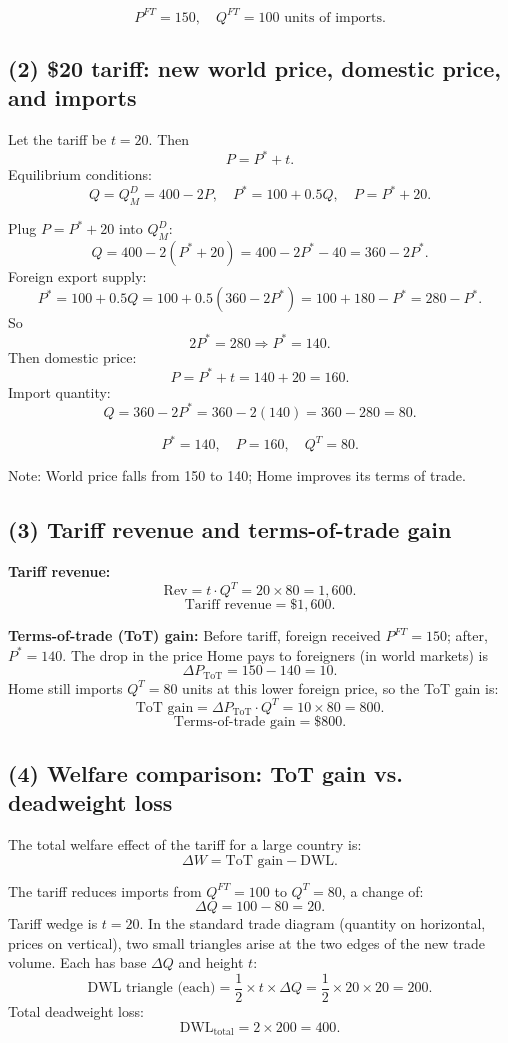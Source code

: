 \documentclass[12pt]{article}
\begin{document}
\[
\boxed{P^{FT} = 150,\quad Q^{FT} = 100 \text{ units of imports.}}
\]

\subsection*{(2) \$20 tariff: new world price, domestic price, and imports}

Let the tariff be $t = 20$. Then
\[
P = P^* + t.
\]
Equilibrium conditions:
\[
Q = Q_M^D = 400 - 2P, 
\quad
P^* = 100 + 0.5Q, 
\quad
P = P^* + 20.
\]

Plug $P = P^* + 20$ into $Q_M^D$:
\[
Q = 400 - 2(P^* + 20) = 400 - 2P^* - 40 = 360 - 2P^*.
\]
Foreign export supply:
\[
P^* = 100 + 0.5Q = 100 + 0.5(360 - 2P^*) = 100 + 180 - P^* = 280 - P^*.
\]
So
\[
2P^* = 280 \Rightarrow P^* = 140.
\]
Then domestic price:
\[
P = P^* + t = 140 + 20 = 160.
\]
Import quantity:
\[
Q = 360 - 2P^* = 360 - 2(140) = 360 - 280 = 80.
\]

\[
\boxed{P^* = 140,\quad P = 160,\quad Q^{T} = 80.}
\]

Note: World price falls from 150 to 140; Home improves its terms of trade.

\subsection*{(3) Tariff revenue and terms-of-trade gain}

\textbf{Tariff revenue:}
\[
\text{Rev} = t \cdot Q^{T} = 20 \times 80 = 1{,}600.
\]
\[
\boxed{\text{Tariff revenue} = \$1{,}600.}
\]

\textbf{Terms-of-trade (ToT) gain:}  
Before tariff, foreign received $P^{FT}=150$; after, $P^* = 140$.  
The drop in the price Home pays to foreigners (in world markets) is
\[
\Delta P_{\text{ToT}} = 150 - 140 = 10.
\]
Home still imports $Q^T = 80$ units at this lower foreign price, so the ToT gain is:
\[
\text{ToT gain} = \Delta P_{\text{ToT}} \cdot Q^{T} = 10 \times 80 = 800.
\]
\[
\boxed{\text{Terms-of-trade gain} = \$800.}
\]

\subsection*{(4) Welfare comparison: ToT gain vs. deadweight loss}

The total welfare effect of the tariff for a large country is:
\[
\Delta W = \text{ToT gain} - \text{DWL}.
\]

The tariff reduces imports from $Q^{FT}=100$ to $Q^T=80$, a change of:
\[
\Delta Q = 100 - 80 = 20.
\]
Tariff wedge is $t = 20$. In the standard trade diagram (quantity on horizontal, prices on vertical), two small triangles arise at the two edges of the new trade volume. Each has base $\Delta Q$ and height $t$:
\[
\text{DWL triangle (each)} = \frac{1}{2} \times t \times \Delta Q
= \frac{1}{2} \times 20 \times 20 = 200.
\]
Total deadweight loss:
\[
\text{DWL}_{\text{total}} = 2 \times 200 = 400.
\]
\end{document}
